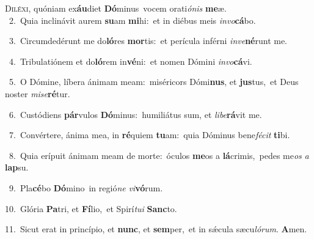 \lettrine{\initial\textcolor{\initialcolor}{D}}{iléxi,} quóniam ex\-\textbf{áu}\-diet \textbf{Dó}\-minus~\star vocem orati\-\textit{ó}\-\textit{nis} \textbf{me}\-æ.\\
{\numbfont\textcolor{\numbcolor}{~2.}}~Quia inclinávit aurem \textbf{su}\-am \textbf{mi}\-hi:~\star et in diébus meis \textit{in}\-\textit{vo}\textbf{cá}bo.\par
{\numbfont\textcolor{\numbcolor}{~3.}}~Circumdedérunt me do\-\textbf{ló}\-res \textbf{mor}\-tis:~\star et perícula inférni \textit{in}\-\textit{ve}\textbf{né}runt me.\par
{\numbfont\textcolor{\numbcolor}{~4.}}~Tribulatiónem et do\-\textbf{ló}\-rem in\-\textbf{vé}\-ni:~\star et nomen Dómini \textit{in}\-\textit{vo}\textbf{cá}vi.\par
{\numbfont\textcolor{\numbcolor}{~5.}}~O Dómine, líbera ánimam meam:~\dagger miséricors Dómi\-\textbf{nus}\-, et \textbf{jus}\-tus,~\star et Deus noster \textit{mi}\-\textit{se}\textbf{ré}tur.\par
{\numbfont\textcolor{\numbcolor}{~6.}}~Custódiens \textbf{pár}\-vulos \textbf{Dó}\-minus:~\star humiliátus sum, et \textit{li}\-\textit{be}\textbf{rá}vit me.\par
{\numbfont\textcolor{\numbcolor}{~7.}}~Convértere, ánima mea, in \textbf{ré}\-quiem \textbf{tu}\-am:~\star quia Dóminus bene\-\textit{fé}\-\textit{cit} \textbf{ti}\-bi.\par
{\numbfont\textcolor{\numbcolor}{~8.}}~Quia erípuit ánimam meam de morte:~\dagger óculos \textbf{me}\-os a \textbf{lá}\-crimis,~\star pedes me\textit{os} \textit{a} \textbf{lap}\-su.\par
{\numbfont\textcolor{\numbcolor}{~9.}}~Pla\-\textbf{cé}\-bo \textbf{Dó}\-mino~\star in regió\textit{ne} \textit{vi}\-\textbf{vó}rum.\par
{\numbfont\textcolor{\numbcolor}{10.}}~Glória \textbf{Pa}\-tri, et \textbf{Fí}\-lio,~\star et Spirí\-\textit{tu}\-\textit{i} \textbf{Sanc}\-to.\par
{\numbfont\textcolor{\numbcolor}{11.}}~Sicut erat in princípio, et \textbf{nunc}\-, et \textbf{sem}\-per,~\star et in sǽcula sæcu\-\textit{ló}\-\textit{rum}. \textbf{A}\-men.\par
